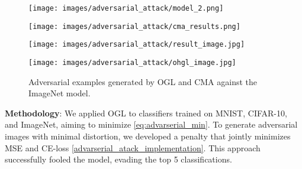 \begin{table}[b!]
    \centering
    \scriptsize %
    \caption{Comparison of methods on Accuracy, MSE, and Time.}
    \label{compare_attack_methods}
\end{table}




\begin{figure}[htbp]
    \centering
    \begin{minipage}[b]{0.2\textwidth}
        \centering
        \texttt{[image: images/adversarial\_attack/model\_2.png]}
    \end{minipage}
    \begin{minipage}[b]{0.2\textwidth}
        \centering
        \texttt{[image: images/adversarial\_attack/cma\_results.png]}
    \end{minipage}
    \begin{minipage}[b]{0.2\textwidth}
        \centering
        \texttt{[image: images/adversarial\_attack/result\_image.jpg]}
    \end{minipage}
    \begin{minipage}[b]{0.2\textwidth}
        \centering
        \texttt{[image: images/adversarial\_attack/ohgl\_image.jpg]}
    \end{minipage}
    \caption{Adversarial examples generated by OGL and CMA  against the ImageNet model.}
    \label{fig:set1}
\end{figure}

\textbf{Methodology}: We applied OGL to classifiers trained on MNIST, CIFAR-10, and ImageNet, aiming to minimize \eqref{eq:advarserial_min}. To generate adversarial images with minimal distortion, we developed a penalty that jointly minimizes MSE and CE-loss \ref{advarserial_atack_implementation}. This approach successfully fooled the model, evading the top 5 classifications.


